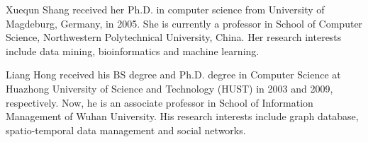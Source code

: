 \documentclass[10pt,journal,compsoc]{IEEEtran}
\begin{document}
\begin{IEEEbiography}{Xuequn Shang} 
received her Ph.D. in computer science from University of Magdeburg, Germany, in 2005. She is currently a professor in School of Computer Science, Northwestern Polytechnical University, China. Her research interests include data mining, bioinformatics and machine learning.
\end{IEEEbiography}
\vspace{-10ex}
\begin{IEEEbiography}{Liang Hong}
received his BS degree and Ph.D. degree in Computer Science at Huazhong University of Science and Technology (HUST) in 2003 and 2009, respectively. Now, he is an associate professor
in School of Information Management of Wuhan University. His research interests include graph database, spatio-temporal data management and social networks.
\end{IEEEbiography}
\end{document}

